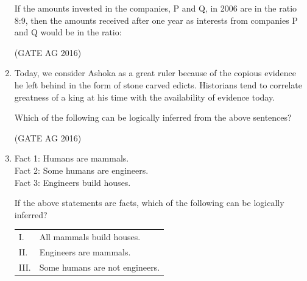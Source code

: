 \documentclass[journal]{IEEEtran}
\begin{document}
\begin{enumerate}
If the amounts invested in the companies, P and Q, in 2006 are in the ratio 8:9, then the amounts received after one year as interests from companies P and Q would be in the ratio:
\begin{enumerate}
\end{enumerate}
\hfill(GATE AG 2016)\\

\medskip

\item 
Today, we consider Ashoka as a great ruler because of the copious evidence he left behind in the form of stone carved edicts. Historians tend to correlate greatness of a king at his time with the availability of evidence today.

Which of the following can be logically inferred from the above sentences?

\begin{enumerate}
\end{enumerate}
\hfill(GATE AG 2016)\\

\medskip

\item 
Fact 1: Humans are mammals. \\
Fact 2: Some humans are engineers. \\
Fact 3: Engineers build houses.

If the above statements are facts, which of the following can be logically inferred?

\begin{tabular}{ll}
I.    & All mammals build houses. \\
II.   & Engineers are mammals. \\
III.  & Some humans are not engineers. \\
\end{tabular}


\end{enumerate}
\end{document}

